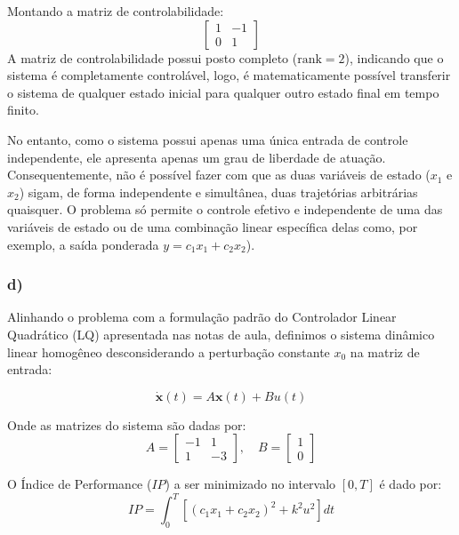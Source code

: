 \documentclass[a4paper, 12pt]{article}%
\begin{document}
Montando a matriz de controlabilidade:
\begin{equation}
\begin{bmatrix} 1 & -1 \\ 0 & 1 \end{bmatrix}
\end{equation}
A matriz de controlabilidade possui posto completo ($\text{rank} = 2$), indicando que o sistema é completamente controlável, logo, é matematicamente possível transferir o sistema de qualquer estado inicial para qualquer outro estado final em tempo finito. 

No entanto, como o sistema possui apenas uma única entrada de controle independente, ele apresenta apenas um grau de liberdade de atuação. Consequentemente, não é possível fazer com que as duas variáveis de estado ($x_1$ e $x_2$) sigam, de forma independente e simultânea, duas trajetórias arbitrárias quaisquer. O problema só permite o controle efetivo e independente de uma das variáveis de estado ou de uma combinação linear específica delas como, por exemplo, a saída ponderada $y = c_1x_1 + c_2x_2$).

\subsubsection*{d)}

Alinhando o problema com a formulação padrão do Controlador Linear Quadrático (LQ) apresentada nas notas de aula, definimos o sistema dinâmico linear homogêneo desconsiderando a perturbação constante $x_0$ na matriz de entrada:

\begin{equation}
\dot{\mathbf{x}}(t) = A\mathbf{x}(t) + B u(t)
\end{equation}

Onde as matrizes do sistema são dadas por:
\begin{equation}
A = \begin{bmatrix} -1 & 1 \\ 1 & -3 \end{bmatrix}, \quad B = \begin{bmatrix} 1 \\ 0 \end{bmatrix}
\end{equation}

O Índice de Performance ($IP$) a ser minimizado no intervalo $[0, T]$ é dado por:
\begin{equation}
IP = \int_0^T \left[ (c_1x_1 + c_2x_2)^2 + k^2u^2 \right] dt
\end{equation}
\end{document}
